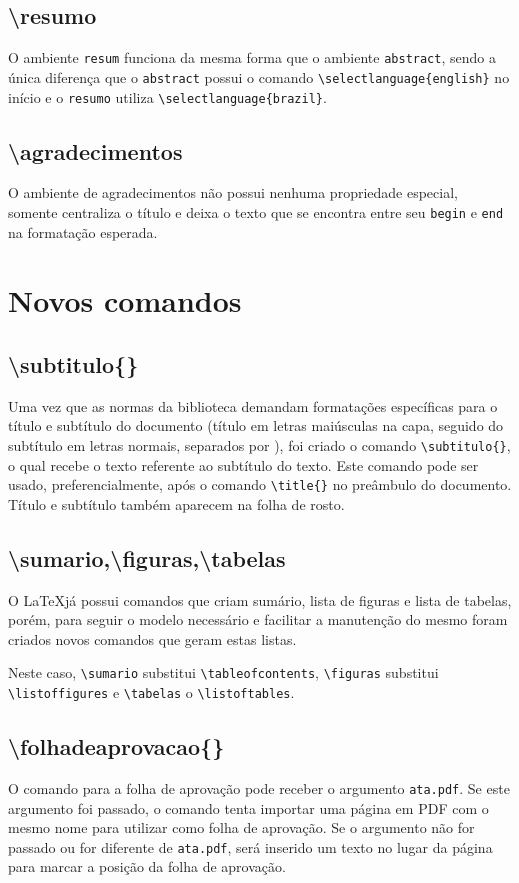 \documentclass{fei}
\begin{document}
    \subsection{\textbackslash resumo}
    O ambiente \texttt{resum} funciona da mesma forma que o ambiente \texttt{abstract}, sendo a única diferença que o \texttt{abstract} possui o comando \verb+\selectlanguage{english}+ no início e o \texttt{resumo} utiliza \verb+\selectlanguage{brazil}+.

    \subsection{\textbackslash agradecimentos}
    O ambiente de agradecimentos não possui nenhuma propriedade especial, somente centraliza o título e deixa o texto que se encontra entre seu \texttt{begin} e \texttt{end} na formatação esperada.

\section{Novos comandos}
    
    \subsection{\textbackslash subtitulo\{\}}
    Uma vez que as normas da biblioteca demandam formatações específicas para o título e subtítulo do documento (título em letras maiúsculas na capa, seguido do subtítulo em letras normais, separados por \aspas{:}), foi criado o comando \verb+\subtitulo{}+, o qual recebe o texto referente ao subtítulo do texto. Este comando pode ser usado, preferencialmente, após o comando \verb+\title{}+ no preâmbulo do documento. Título e subtítulo também aparecem na folha de rosto.
    
    \subsection{\textbackslash sumario,\textbackslash figuras,\textbackslash tabelas}
    O \LaTeX já possui comandos que criam sumário, lista de figuras e lista de tabelas, porém, para seguir o modelo necessário e facilitar a manutenção do mesmo foram criados novos comandos que geram estas listas.

    Neste caso, \verb+\sumario+ substitui \verb+\tableofcontents+, \verb+\figuras+ substitui \verb+\listoffigures+ e \verb+\tabelas+ o \verb+\listoftables+.

    \subsection{\textbackslash folhadeaprovacao\{\}}
    O comando para a folha de aprovação pode receber o argumento \texttt{ata.pdf}. Se este argumento foi passado, o comando tenta importar uma página em PDF com o mesmo nome para utilizar como folha de aprovação. Se o argumento não for passado ou for diferente de \texttt{ata.pdf}, será inserido um texto no lugar da página para marcar a posição da folha de aprovação.
\end{document}
